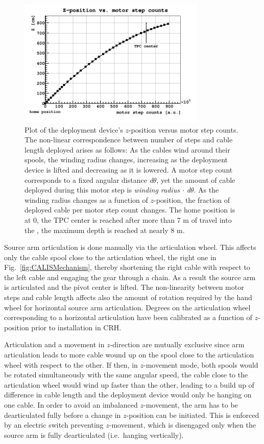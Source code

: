 \begin{figure}[htbp]
 \centering
 \includegraphics[width=0.8\textwidth]{Figures/MSC_Z}
 \caption{Plot of the deployment device's $z$-position versus motor step counts. The non-linear correspondence between number of steps and cable length deployed arises as follows: As the cables wind around their spools, the winding radius changes, increasing as the deployment device is lifted and decreasing as it is lowered. A motor step count corresponds to a fixed angular distance \textit{d$\theta$}, yet the amount of cable deployed during this motor step is \textit{winding radius $\cdot$ d$\theta$}. As the winding radius changes as a function of $z$-position, the fraction of deployed cable per motor step count changes. The home position is at 0, the TPC center is reached after more than 7 m of travel into the \lsv, the maximum depth is reached at nearly 8 m.}
 \label{fig:z_test}
\end{figure}


Source arm articulation is done manually via the articulation wheel. This affects only the cable spool close to the articulation wheel, the right one in Fig.~\ref{fig:CALISMechanism}, thereby shortening the right cable with respect to the left cable and engaging the gear through a chain. As a result the source arm is articulated and the pivot center is lifted. The non-linearity between motor steps and cable length affects also the amount of rotation required by the hand wheel for horizontal source arm articulation. Degrees on the articulation wheel corresponding to a horizontal articulation have been calibrated as a function of $z$-position prior to installation in CRH.

Articulation and a movement in $z$-direction are mutually exclusive since arm articulation leads to more cable wound up on the spool close to the articulation wheel with respect to the other. If then, in $z$-movement mode, both spools would be rotated simultaneously with the same angular speed, the cable close to the articulation wheel would wind up faster than the other, leading to a build up of difference in cable length and the deployment device would only be hanging on one cable. In order to avoid an imbalanced $z$-movement, the arm has to be dearticulated fully before a change in $z$-position can be initiated. This is enforced by an electric switch preventing $z$-movement, which is disengaged only when the source arm is fully dearticulated (i.e.~hanging vertically). 

